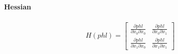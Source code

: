 \documentclass[paper=A3, 
   paper=landscape,]{scrartcl}
\begin{document}
\paragraph{Hessian}

\begin{align}
H(phl) = \begin{bmatrix}
\frac{\partial phl }{\partial x_0 \partial  x_0} & \frac{\partial phl }{\partial x_0 \partial x_1}\\
\frac{\partial phl }{\partial x_1 \partial  x_0} & \frac{\partial phl }{\partial x_1 \partial x_1}
\end{bmatrix}
\end{align}




\newcommand{\dfuncaz}{\xi_i x_0 + x_1 -\eta_i}
\newcommand{\dfuncan}{\left( 1+ \left( \frac {\z} {\delta} \right) ^2\right)^\frac{1}{2} }




\newcommand{\dfagain}{\frac{1}{2}\left( 1+ \left( \frac {\z} {\delta} \right) ^2\right)^{-\frac{1}{2}}}
\end{document}
